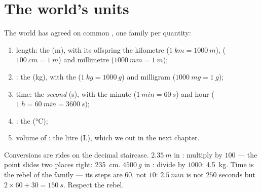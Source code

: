 \section{The world's units}

\begin{definition}\label{def:g6:measurement-in-science:units}
The world has agreed on common , one family per quantity:
\begin{enumerate}
  \item length: the \emph{} (\unit{m}), with its offspring
        the kilometre ($\qty{1}{km} = \qty{1000}{m}$), 
        ($\qty{100}{cm} = \qty{1}{m}$) and millimetre
        ($\qty{1000}{mm} = \qty{1}{m}$);
  \item {}: the \emph{} (\unit{kg}), with the 
        ($\qty{1}{kg} = \qty{1000}{g}$) and milligram
        ($\qty{1000}{mg} = \qty{1}{g}$);
  \item time: the \emph{second} (\unit{s}), with the minute
        ($\qty{1}{min} = \qty{60}{s}$) and hour
        ($\qty{1}{h} = \qty{60}{min} = \qty{3600}{s}$);
  \item {}: the  (\unit{\celsius});
  \item volume of : the litre (\unit{L}), which we 
        out in the next chapter.
\end{enumerate}
\end{definition}

\begin{example}\label{ex:g6:measurement-in-science:convert}
Conversions are rides on the decimal staircase.
$\qty{2.35}{m}$ in : multiply by $100$ --- the point
slides two places right: \qty{235}{cm}. $\qty{4500}{g}$ in
: divide by $1000$: \qty{4.5}{kg}. Time is the rebel of
the family --- its steps are $60$, not $10$: $\qty{2.5}{min}$ is
not $250$ seconds but $2 \times 60 + 30 = \qty{150}{s}$. Respect
the rebel.
\end{example}

